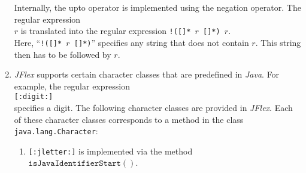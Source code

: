 \begin{enumerate}
      Internally, the upto operator is implemented using the negation operator.  The regular expression
      \\[0.2cm]
      \hspace*{1.3cm}
      \texttt{}$r$ \qquad is translated into the regular expression \qquad
      \texttt{!([]* $r$ []*) $r$}.
      \\[0.2cm]
      Here, ``\texttt{!([]* $r$ []*)}'' specifies any string that does not
      contain $r$.  This string then has to be followed by $r$.
\item \textsl{JFlex} supports certain character classes that are predefined in \textsl{Java}.
      For example, the regular expression
      \\[0.2cm]
      \hspace*{1.3cm}
      \texttt{[:digit:]}
      \\[0.2cm]
      specifies a digit.  The following character classes are provided in \textsl{JFlex}.  Each
      of these character classes corresponds to a method in the class \texttt{java.lang.Character}:
      \begin{enumerate}
      \item \texttt{[:jletter:]} is implemented via the method
            $\texttt{isJavaIdentifierStart}()$.
            

\end{enumerate}
\end{enumerate}
